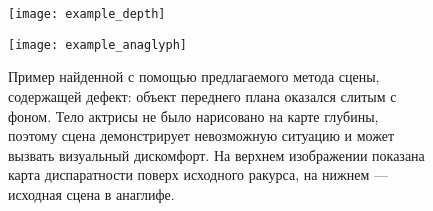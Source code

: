 \begin{figure}[!h]
	\begin{minipage}[b]{1.0\linewidth}
		\centering
		\centerline{ \texttt{[image: example\_depth]} }
	\end{minipage}
	\begin{minipage}[b]{1.0\linewidth}
		\centering
		\centerline{ \texttt{[image: example\_anaglyph]} }
	\end{minipage}
    \caption{Пример найденной с помощью предлагаемого метода сцены, 
    	содержащей дефект: объект переднего плана оказался слитым с фоном. 
    	Тело актрисы не было нарисовано  на карте глубины, поэтому сцена 
    	демонстрирует невозможную ситуацию и может вызвать визуальный дискомфорт. 
    	На верхнем изображении показана карта диспаратности поверх 
    	исходного ракурса, на нижнем --- исходная сцена в анаглифе. }
	\label{fig:example}
\end{figure}
